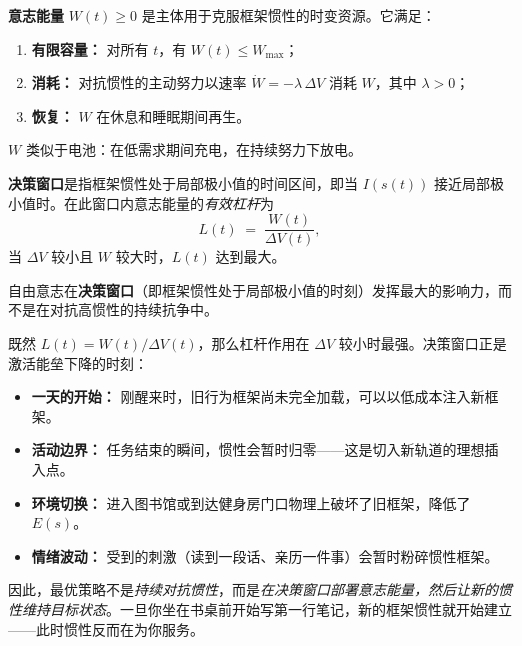 \begin{definition}[意志能量]\label{def:volition}
\textbf{意志能量} $W(t) \geq 0$ 是主体用于克服框架惯性的时变资源。它满足：
\begin{enumerate}[nosep]
  \item \textbf{有限容量：} 对所有 $t$，有 $W(t) \leq W_{\max}$；
  \item \textbf{消耗：} 对抗惯性的主动努力以速率 $\dot{W} = -\lambda\,\Delta V$ 消耗 $W$，其中 $\lambda > 0$；
  \item \textbf{恢复：} $W$ 在休息和睡眠期间再生。
\end{enumerate}
\end{definition}

\begin{remark}
$W$ 类似于电池：在低需求期间充电，在持续努力下放电。
\end{remark}

\begin{definition}[决策窗口]\label{def:window}
\textbf{决策窗口}是指框架惯性处于局部极小值的时间区间，即当 $I(s(t))$ 接近局部极小值时。在此窗口内意志能量的\emph{有效杠杆}为
\[
  L(t) \;=\; \frac{W(t)}{\Delta V(t)},
\]
当 $\Delta V$ 较小且 $W$ 较大时，$L(t)$ 达到最大。
\end{definition}

\begin{theorem}[自由意志的最大杠杆]\label{thm:leverage}
自由意志在\textbf{决策窗口}（即框架惯性处于局部极小值的时刻）发挥最大的影响力，而不是在对抗高惯性的持续抗争中。
\end{theorem}

\begin{discussion}
既然 $L(t) = W(t)/\Delta V(t)$，那么杠杆作用在 $\Delta V$ 较小时最强。决策窗口正是激活能垒下降的时刻：
\begin{itemize}[nosep]
  \item \textbf{一天的开始：} 刚醒来时，旧行为框架尚未完全加载，可以以低成本注入新框架。
  \item \textbf{活动边界：} 任务结束的瞬间，惯性会暂时归零——这是切入新轨道的理想插入点。
  \item \textbf{环境切换：} 进入图书馆或到达健身房门口物理上破坏了旧框架，降低了 $E(s)$。
  \item \textbf{情绪波动：} 受到的刺激（读到一段话、亲历一件事）会暂时粉碎惯性框架。
\end{itemize}
因此，最优策略不是\emph{持续对抗惯性}，而是\emph{在决策窗口部署意志能量，然后让新的惯性维持目标状态}。一旦你坐在书桌前开始写第一行笔记，新的框架惯性就开始建立——此时惯性反而在为你服务。
\end{discussion}

